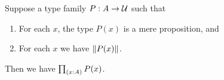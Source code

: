 \documentclass[hott-all.tex]{subfiles}
\begin{document}
\begin{cor}
  Suppose a type family $P:A\to \mathcal{U}$ such that
  \begin{enumerate}
  \item For each $x$, the type $P(x)$ is a mere proposition, and
  \item For each $x$ we have $\mathopen{}\left\Vert P(x)\right\Vert_{}\mathclose{}$.
  \end{enumerate}
  Then we have $\prd{x:A} P(x)$.
\end{cor}
%
%
%
%
%
\end{document}

